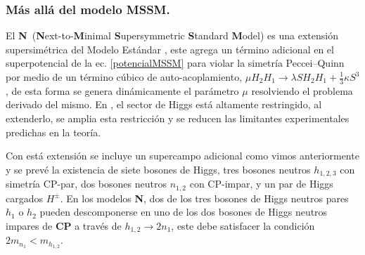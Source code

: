 
\subsubsection{Más allá del modelo MSSM.}
El \textbf{N}\MSSM~(\textbf{N}ext-to-\textbf{M}inimal \textbf{S}upersymmetric \textbf{S}tandard \textbf{M}odel) es una extensión supersimétrica del Modelo Estándar \citep{MSSM_2}, este agrega un término adicional en el superpotencial de la ec. \ref{potencialMSSM} para violar la simetría Peccei–Quinn por medio de un término cúbico de auto-acoplamiento, $\mu H_2 H_1 \rightarrow \lambda S H_2 H_1 + \frac{1}{3} \kappa S^3$ \citep{cms_collaboration_search_2019-1}, de esta forma se genera dinámicamente el parámetro $\mu$ resolviendo el problema derivado del mismo. En \MSSM, el sector de Higgs está altamente restringido, al extenderlo, se amplia esta restricción y se reducen las limitantes experimentales predichas en la teoría. 

Con está extensión se incluye un supercampo adicional como vimos anteriormente y se prevé la existencia de siete bosones de Higgs, tres bosones neutros $h_{1,2,3}$ con simetría CP-par, dos bosones neutros $n_{1,2}$ con CP-impar, y un par de Higgs cargados $H^\pm$. En los modelos \textbf{N}\MSSM, dos de los tres bosones de Higgs neutros pares $h_1$ o $h_2$  pueden descomponerse en uno de los dos bosones de Higgs neutros impares de \textbf{CP} a través de $h_{1,2} \rightarrow 2n_1$, este debe satisfacer la condición $2m_{n_1} < m_{h_{1,2}}$.




